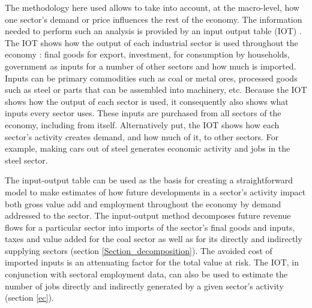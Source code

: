 \documentclass[12pt,english]{article}
\begin{document}
The methodology here used allows to take into account, at the macro-level, how one sector's demand or price influences the rest of the economy. The information needed to perform such an analysis %
is provided by an input output table (IOT) \citep{miller2009input}. %
The IOT shows how the output of each industrial sector is used throughout the economy : final goods for export, investment, for consumption by households, government as inputs for a number of other sectors and how much is imported. Inputs can be primary commodities such as coal or metal ores, processed goods such as steel or parts that can be assembled into machinery, etc. Because the IOT shows how the output of each sector is used, it consequently also shows what inputs every sector uses. These inputs are purchased from all sectors of the economy, including from itself. Alternatively put, the IOT shows how each sector's activity creates demand, and how much of it, to other sectors. For example, making cars out of steel generates economic activity and jobs in the steel sector. 


The input-output table can be used as the basis for creating a straightforward model to make estimates of how future developments in a sector's activity impact both gross value add and employment throughout the economy by demand addressed to the sector.
The input-output method decomposes future revenue flows for a particular sector into imports of the sector's final goods and inputs, taxes and value added for the coal sector as well as for its directly and indirectly supplying sectors (section \ref{Section_decomposition}). The avoided cost of imported inputs is an attenuating factor for the total value at risk. 
The IOT, in conjunction with sectoral employment data, can also be used to estimate the number of jobs directly and indirectly generated by a given sector's activity (section \ref{ec}). 
\end{document}
